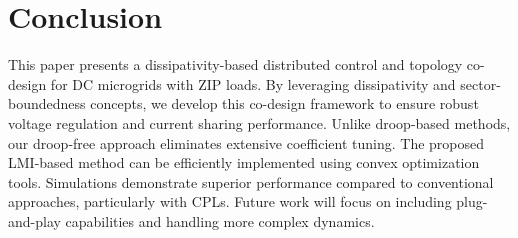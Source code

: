 \documentclass[letterpaper, 10 pt, conference]{ieeeconf}%
\newcommand{\0}{\mathbf{0}}
\begin{document}
\section{Conclusion}\label{Sec:Conclusion}
This paper presents a dissipativity-based distributed control and topology co-design for DC microgrids with ZIP loads. By leveraging dissipativity and sector-boundedness concepts, we develop this co-design framework to ensure robust voltage regulation and current sharing performance. Unlike droop-based methods, our droop-free approach eliminates extensive coefficient tuning. The proposed LMI-based method can be efficiently implemented using convex optimization tools. Simulations demonstrate superior performance compared to conventional approaches, particularly with CPLs. Future work will focus on including plug-and-play capabilities and handling more complex dynamics.



\end{document}
